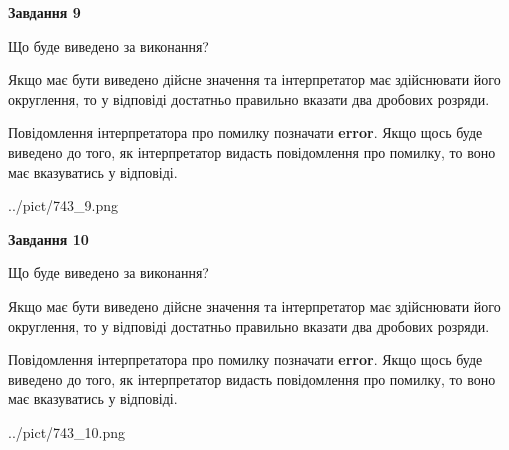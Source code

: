\documentclass[12pt, ukrainian]{article}
\begin{document}
{\begin {Large}
{\begin {center}\textbf{Завдання 9}\end {center}}\par
Що буде виведено за виконання? \par

Якщо має бути виведено дійсне значення та інтерпретатор має здійснювати його округлення, 
то у відповіді достатньо правильно вказати два дробових розряди.

Повідомлення інтерпретатора про помилку позначати \textbf{error}.
Якщо щось буде виведено до того, як інтерпретатор видасть повідомлення про помилку, 
то воно має вказуватись у відповіді. \par

\begin{center}
	{../pict/743_9.png}
\end{center}
\newpage

{\begin {center}\textbf{Завдання 10}\end {center}}\par
Що буде виведено за виконання? \par

Якщо має бути виведено дійсне значення та інтерпретатор має здійснювати його округлення, 
то у відповіді достатньо правильно вказати два дробових розряди.

Повідомлення інтерпретатора про помилку позначати \textbf{error}.
Якщо щось буде виведено до того, як інтерпретатор видасть повідомлення про помилку, 
то воно має вказуватись у відповіді. \par

\begin{center}
	{../pict/743_10.png}
\end{center}
\newpage

\end {Large}}
\end{document}
